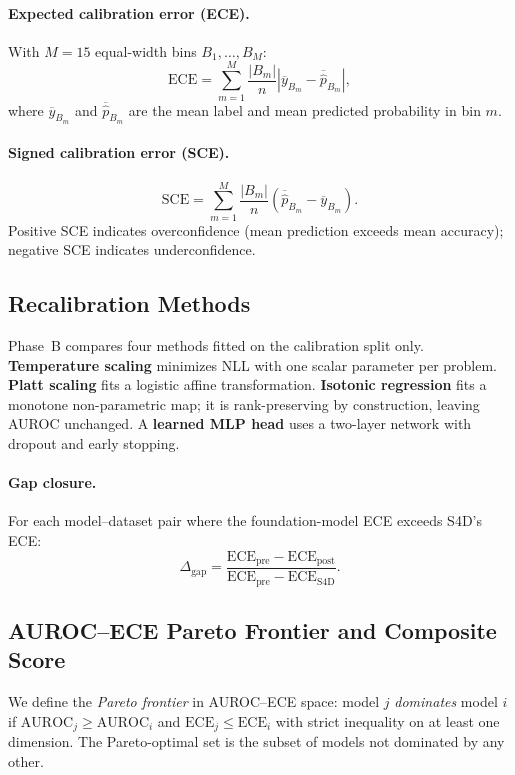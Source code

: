 \paragraph{Expected calibration error (ECE).}
With $M=15$ equal-width bins $B_1,\ldots,B_M$:
\[
  \mathrm{ECE} = \sum_{m=1}^{M} \frac{|B_m|}{n}
    \left|\overline{y}_{B_m} - \overline{\hat{p}}_{B_m}\right|,
\]
where $\overline{y}_{B_m}$ and $\overline{\hat{p}}_{B_m}$ are the mean label and mean
predicted probability in bin $m$.

\paragraph{Signed calibration error (SCE).}
\[
  \mathrm{SCE} = \sum_{m=1}^{M} \frac{|B_m|}{n}
    \left(\overline{\hat{p}}_{B_m} - \overline{y}_{B_m}\right).
\]
Positive SCE indicates overconfidence (mean prediction exceeds mean accuracy);
negative SCE indicates underconfidence.

\subsection{Recalibration Methods}

Phase~B compares four methods fitted on the calibration split only.
\textbf{Temperature scaling} minimizes NLL with one scalar parameter per problem.
\textbf{Platt scaling} fits a logistic affine transformation.
\textbf{Isotonic regression} fits a monotone non-parametric map; it is rank-preserving
by construction, leaving AUROC unchanged.
A \textbf{learned MLP head} uses a two-layer network with dropout and early stopping.

\paragraph{Gap closure.}
For each model--dataset pair where the foundation-model ECE exceeds S4D's ECE:
\[
  \Delta_{\mathrm{gap}} =
  \frac{\mathrm{ECE}_{\mathrm{pre}} - \mathrm{ECE}_{\mathrm{post}}}
       {\mathrm{ECE}_{\mathrm{pre}} - \mathrm{ECE}_{\mathrm{S4D}}}.
\]

\subsection{AUROC--ECE Pareto Frontier and Composite Score}
\label{sec:pareto}

We define the \emph{Pareto frontier} in AUROC--ECE space: model $j$ \emph{dominates} model
$i$ if $\mathrm{AUROC}_j \geq \mathrm{AUROC}_i$ and $\mathrm{ECE}_j \leq \mathrm{ECE}_i$
with strict inequality on at least one dimension. The Pareto-optimal set is the subset of
models not dominated by any other.

